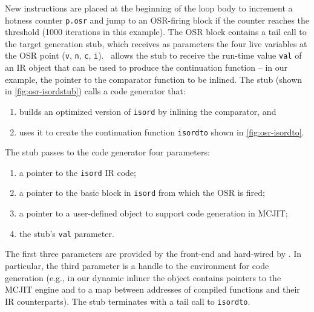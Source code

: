 \noindent New instructions are placed at the beginning of the loop body to increment a hotness counter {\tt p.osr} and jump to an OSR-firing block if the counter reaches the threshold (1000 iterations in this example). The OSR block contains a tail call to the target generation stub, which receives as parameters the four live variables at the OSR point ({\tt v}, {\tt n}, {\tt c}, {\tt i}). \osrkit\ allows the stub to receive the run-time value {\tt val} of an IR object that can be used to produce the continuation function -- in our example, the pointer to the comparator function to be inlined. The stub (shown in \myfigure\ref{fig:osr-isordstub}) calls a code generator that:
\begin{enumerate}[parsep=0pt,itemsep=3pt]
 \item builds an optimized version of {\tt isord} by inlining the comparator, and
 \item uses it to create the continuation function {\tt isordto} shown in \myfigure\ref{fig:osr-isordto}.
\end{enumerate}

\noindent The stub passes to the code generator four parameters:
\begin{enumerate}[parsep=0pt,itemsep=3pt]
 \item a pointer to the {\tt isord} IR code;
 \item a pointer to the basic block in {\tt isord} from which the OSR is fired;
 \item a pointer to a user-defined object to support code generation in MCJIT;
 \item the stub's {\tt val} parameter.
\end{enumerate}

\noindent The first three parameters are provided by the front-end and hard-wired by \osrkit. In particular, the third parameter is a handle to the environment for code generation (e.g., in our dynamic inliner the object contains pointers to the MCJIT engine and to a map between addresses of compiled functions and their IR counterparts). The stub terminates with a tail call to {\tt isordto}.


